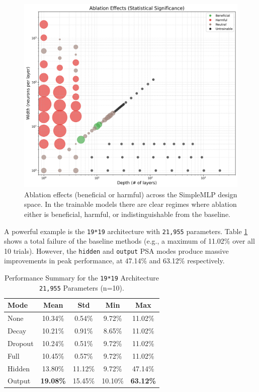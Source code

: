 \documentclass[conference]{IEEEtran}
\begin{document}
\begin{figure}[ht]
\centering
\includegraphics[width=\linewidth]{SimpleMLP_Heatmap_Ablation_Effects.png}
\caption{Ablation effects (beneficial or harmful) across the SimpleMLP design space. In the trainable models there are clear regimes where ablation either is beneficial, harmful, or indistinguishable from the baseline.}
\label{fig:heatmap_ablation_effects}
\end{figure}

A powerful example is the \texttt{19*19} architecture with \texttt{21,955} parameters. Table \ref{tab:19x19_results} shows a total failure of the baseline methods (e.g., a maximum of 11.02\% over all 10 trials). However, the \verb|hidden| and \verb|output| PSA modes produce massive improvements in peak performance, at 47.14\% and 63.12\% respectively.

\begin{table}[h!]
\centering
\caption{Performance Summary for the \texttt{19*19} Architecture\\ \texttt{21,955} Parameters (n=10).}
\label{tab:19x19_results}
\begin{tabular}{lcccc}
\toprule
\textbf{Mode} & \textbf{Mean} & \textbf{Std} & \textbf{Min} & \textbf{Max} \\
\midrule
None    & 10.34\% & 0.54\% & 9.72\% & 11.02\% \\
Decay   & 10.21\% & 0.91\% & 8.65\% & 11.02\% \\
Dropout & 10.24\% & 0.51\% & 9.72\% & 11.02\% \\
Full    & 10.45\% & 0.57\% & 9.72\% & 11.02\% \\
Hidden  & 13.80\% & 11.12\% & 9.72\% & 47.14\% \\
Output  & \textbf{19.08\%} & 15.45\% & 10.10\% & \textbf{63.12\%} \\
\bottomrule
\end{tabular}
\end{table}
\end{document}
